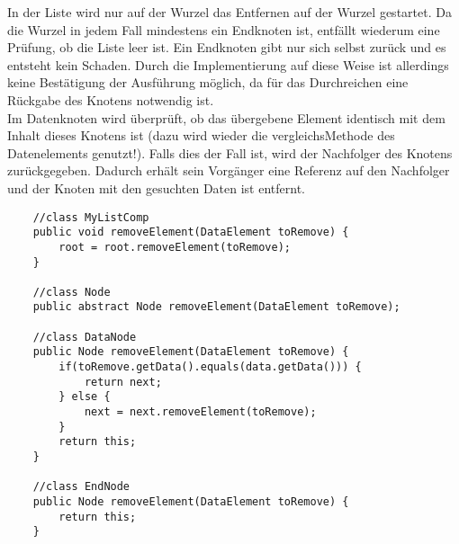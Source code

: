 \documentclass{article}
\begin{document}
In der Liste wird nur auf der Wurzel das Entfernen auf der Wurzel gestartet. Da die Wurzel in jedem Fall mindestens ein Endknoten ist, entfällt wiederum eine Prüfung, ob die Liste leer ist. Ein Endknoten gibt nur sich selbst zurück und es entsteht kein Schaden. Durch die Implementierung auf diese Weise ist allerdings keine Bestätigung der Ausführung möglich, da für das  Durchreichen eine Rückgabe des Knotens notwendig ist. \\
Im Datenknoten wird überprüft, ob das übergebene Element identisch mit dem Inhalt dieses Knotens ist (dazu wird wieder die vergleichsMethode des Datenelements genutzt!). Falls dies der Fall ist, wird der Nachfolger des Knotens zurückgegeben. Dadurch erhält sein Vorgänger eine Referenz auf den Nachfolger und der Knoten mit den gesuchten Daten ist entfernt. 
\begin{verbatim}
    //class MyListComp 
    public void removeElement(DataElement toRemove) {
        root = root.removeElement(toRemove);
    }

    //class Node 
    public abstract Node removeElement(DataElement toRemove);

    //class DataNode 
    public Node removeElement(DataElement toRemove) {
        if(toRemove.getData().equals(data.getData())) {
            return next;
        } else {
            next = next.removeElement(toRemove);
        }
        return this;
    }

    //class EndNode 
    public Node removeElement(DataElement toRemove) {
        return this;
    }
\end{verbatim}
\end{document}
